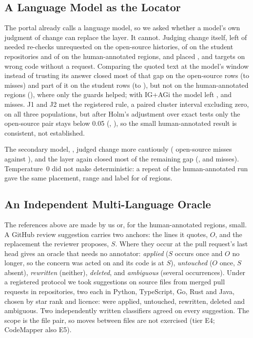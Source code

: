 \subsection{A Language Model as the Locator}\label{sec:llm}
The portal already calls a language model, so we asked whether a model's own judgment of change can replace the layer. It cannot. Judging change itself, \wjModel{} left \wjPubSelfMissK{} of \wjPubSelfMissN{} needed re-checks unrequested on the open-source histories, \wjStuSelfMissK{} of \wjStuSelfMissN{} on the student repositories and \wjHumSelfMissK{} of \wjHumSelfMissN{} on the human-annotated regions, and placed \wjPubSelfSilentK{}, \wjStuSelfSilentK{} and \wjHumSelfSilentK{} targets on wrong code without a request. Comparing the quoted text at the model's window instead of trusting its answer closed most of that gap on the open-source rows (to \wjPubQMissK{} misses) and part of it on the student rows (to \wjStuQMissK{}), but not on the human-annotated regions (\wjHumQMissK{}), where only the guards helped; with IG+AGi the model left \wjPubGiMissK{}, \wjStuGiMissK{} and \wjHumGiMissK{} misses. J1 and J2 met the registered rule, a paired cluster interval excluding zero, on all three populations, but after Holm's adjustment over \wjHolmTests{} exact tests only the open-source pair stays below 0.05 (\wjPubJOneHolm{}, \wjPubJTwoHolm{}), so the small human-annotated result is consistent, not established.

The secondary model, \wjNemoModel{}, judged change more cautiously (\wjNemoPubSelfMissK{} open-source misses against \wjPubSelfMissK{}), and the layer again closed most of the remaining gap (\wjNemoPubGiMissK{}, \wjNemoStuGiMissK{} and \wjNemoHumGiMissK{} misses). Temperature~0 did not make \wjModel{} deterministic: a repeat of the human-annotated run gave the same placement, range and label for \wjRepSameAll{} of \wjRepN{} regions.


\subsection{An Independent Multi-Language Oracle}\label{sec:suggest}
The references above are made by us or, for the human-annotated regions, small. A GitHub review suggestion carries two anchors: the lines it quotes, $O$, and the replacement the reviewer proposes, $S$. Where they occur at the pull request's last head gives an oracle that needs no annotator: \emph{applied} ($S$ occurs once and $O$ no longer, so the concern was acted on and its code is at $S$), \emph{untouched} ($O$ once, $S$ absent), \emph{rewritten} (neither), \emph{deleted}, and \emph{ambiguous} (several occurrences). Under a registered protocol we took \wkUnits{} suggestions on source files from \wkPRs{} merged pull requests in \wkRepos{} repositories, two each in Python, TypeScript, Go, Rust and Java, chosen by star rank and licence: \wkClsApplied{} were applied, \wkClsUntouched{} untouched, \wkClsRewritten{} rewritten, \wkClsGone{} deleted and \wkClsAmbiguous{} ambiguous. Two independently written classifiers agreed on every suggestion. The scope is the file pair, so moves between files are not exercised (tier E4; CodeMapper also E5).

